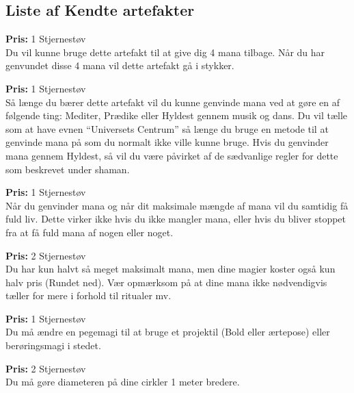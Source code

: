 \subsection*{Liste af Kendte artefakter}
\begin{artefakt*}
\textbf{Pris:} 1 Stjernestøv\\
Du vil kunne bruge dette artefakt til at give dig 4 mana tilbage. Når du har genvundet disse 4 mana vil dette artefakt gå i stykker.
\end{artefakt*}

\begin{artefakt*}
\textbf{Pris:} 1 Stjernestøv\\
Så længe du bærer dette artefakt vil du kunne genvinde mana ved at gøre en af følgende ting: Mediter, Prædike eller Hyldest gennem musik og dans. Du vil tælle som at have evnen “Universets Centrum” så længe du bruge en metode til at genvinde mana på som du normalt ikke ville kunne bruge. Hvis du genvinder mana gennem Hyldest, så vil du være påvirket af de sædvanlige regler for dette som beskrevet under shaman.
\end{artefakt*} 

\begin{artefakt*}
\textbf{Pris:} 1 Stjernestøv\\
Når du genvinder mana og når dit maksimale mængde af mana vil du samtidig få fuld liv. Dette virker ikke hvis du ikke mangler mana, eller hvis du bliver stoppet fra at få fuld mana af nogen eller noget.
\end{artefakt*}

\begin{artefakt*}
\textbf{Pris:} 2 Stjernestøv\\
Du har kun halvt så meget maksimalt mana, men dine magier koster også kun halv pris (Rundet ned). Vær opmærksom på at dine mana ikke nødvendigvis tæller for mere i forhold til ritualer mv.
\end{artefakt*}

\begin{artefakt*}
\textbf{Pris:} 1 Stjernestøv\\
Du må ændre en pegemagi til at bruge et projektil (Bold eller ærtepose) eller berøringsmagi i stedet.
\end{artefakt*}

\begin{artefakt*}
\textbf{Pris:} 2 Stjernestøv\\
Du må gøre diameteren på dine cirkler 1 meter bredere. 
\end{artefakt*}

